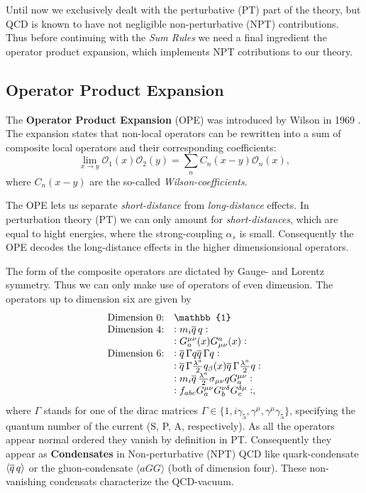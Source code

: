 \documentclass[../../index.tex]{subfiles}
\begin{document}
Until now we exclusively dealt with the perturbative (PT) part of the theory,
but QCD is known to have not negligible non-perturbative (NPT) contributions.
Thus before continuing with the \textit{Sum Rules} we need a final ingredient
the operator product expansion, which implements NPT cotributions to our theory.


\subsection{Operator Product Expansion}
The \textbf{Operator Product Expansion} (OPE) was introduced by Wilson in 1969
\cite{Wilson1969}. The expansion states that non-local operators can be rewritten into a
sum of composite local operators and their corresponding coefficients:
\begin{equation}
  \label{eq:OPE}
  \lim_{x\to y} \mathcal{O}_1(x) \mathcal{O}_2(y) = \sum_n C_n(x-y)\mathcal{O}_n(x),
\end{equation}
where $C_n(x-y)$ are the so-called \textit{Wilson-coefficients}.

The OPE lets us separate \textit{short-distance} from \textit{long-distance}
effects. In perturbation theory (PT) we can only amount for
\textit{short-distances}, which are equal to hight energies, where the
strong-coupling $\alpha_s$ is small. Consequently the OPE decodes the
long-distance effects in the higher dimensionsional operators.

The form of the composite operators are dictated by Gauge- and Lorentz symmetry.
Thus we can only make use of operators of even dimension. The operators up to 
dimension six are given by \cite{Pascual1984}
\begin{equation}
  \begin{array}{ll}
    \text{Dimension 0:} & \mathbb{1} \\
    \text{Dimension 4:} & :m_i \anti{q} q: \\
                        & :G_a^{\mu\nu}(x) G_{\mu\nu}^a(x): \\
    \text{Dimension 6:} & :\anti{q} \Gamma q \anti{q} \Gamma q: \\
                        & :\anti{q} \Gamma \frac{\lambda^a}{2} q_\beta(x) \anti{q} \Gamma \frac{\lambda^a}{2} q: \\
                        & :m_i \anti{q} \frac{\lambda^a}{2} \sigma_{\mu\nu} q G^{\mu\nu}_a: \\
                        & :f_{abc} G_a^{\mu\nu} G_b^{\nu\delta} G_c^{\delta\mu}:,
  \end{array}
\end{equation}
where $\Gamma$ stands for one of the dirac matrices $\Gamma \in \{1, i \gamma_5,
\gamma^\mu, \gamma^\mu \gamma_5\}$, specifying the quantum number of the current
(S, P, A, respectively). As all the
operators appear normal ordered they vanish by definition in PT. Consequently
they appear as \textbf{Condensates} in Non-perturbative (NPT) QCD like
quark-condensate $\langle \overline{q}\, q \rangle$ or the gluon-condensate $\langle a
GG \rangle$ (both of dimension four). These non-vanishing condensats
characterize the QCD-vacuum.
\end{document}
